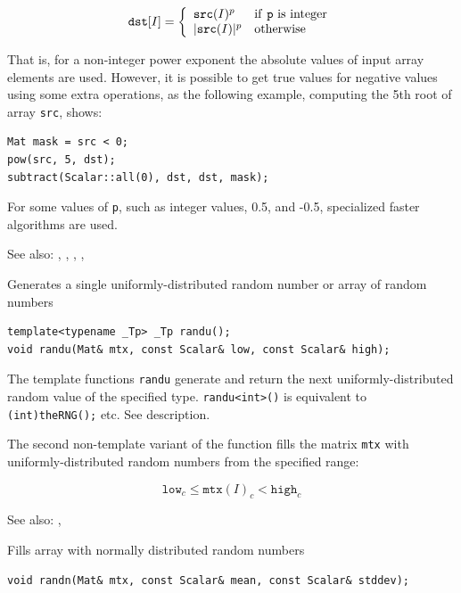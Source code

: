 \[
\texttt{dst} [I] = \left\{ \begin{array}{l l} \texttt{src}(I)^p & \mbox{if \texttt{p} is integer}\\ |\texttt{src}(I)|^p & \mbox{otherwise}\\ \end{array} \right.
\]

That is, for a non-integer power exponent the absolute values of input array elements are used. However, it is possible to get true values for negative values using some extra operations, as the following example, computing the 5th root of array \texttt{src}, shows:

\begin{lstlisting}
Mat mask = src < 0;
pow(src, 5, dst);
subtract(Scalar::all(0), dst, dst, mask);
\end{lstlisting}

For some values of \texttt{p}, such as integer values, 0.5, and -0.5, specialized faster algorithms are used.

See also: , , , , 

\label{randu}
Generates a single uniformly-distributed random number or array of random numbers

\begin{lstlisting}
template<typename _Tp> _Tp randu();
void randu(Mat& mtx, const Scalar& low, const Scalar& high);
\end{lstlisting}
\begin{description}
\end{description}

The template functions \texttt{randu} generate and return the next uniformly-distributed random value of the specified type. \texttt{randu<int>()} is equivalent to \texttt{(int)theRNG();} etc. See  description.

The second non-template variant of the function fills the matrix \texttt{mtx} with uniformly-distributed random numbers from the specified range:

\[\texttt{low}_c \leq \texttt{mtx}(I)_c < \texttt{high}_c\]

See also: , 

\label{randn}
Fills array with normally distributed random numbers

\begin{lstlisting}
void randn(Mat& mtx, const Scalar& mean, const Scalar& stddev);
\end{lstlisting}
\begin{description}
\end{description}

